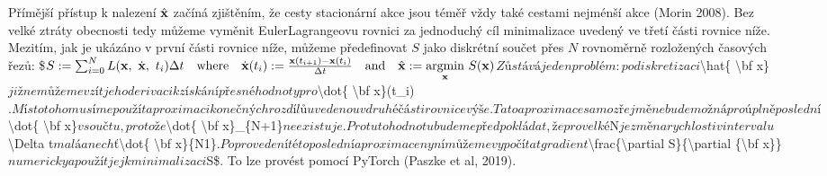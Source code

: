 \documentclass[letterpaper,10pt,english]{jupyterBook}
\begin{document}
\sphinxAtStartPar
{} Přímější přístup k nalezení \(\hat{\bf x}\) začíná zjištěním, že cesty stacionární akce jsou téměř vždy také cestami nejménší akce (Morin 2008). Bez velké ztráty obecnosti tedy můžeme vyměnit Euler\sphinxhyphen{}Lagrangeovu rovnici za jednoduchý cíl minimalizace uvedený ve třetí části rovnice níže. Mezitím, jak je ukázáno v první části rovnice níže, můžeme předefinovat \(S\) jako diskrétní součet přes \(N\) rovnoměrně rozložených časových řezů:
\$\(
S := \sum_{i=0}^{N} L({\bf x}, ~ \dot{{\bf x}}, ~ t_i) \Delta t \quad \textrm{where} \quad \dot{{\bf x}}(t_i) := \frac{ {\bf x}(t_{i+1}) - {\bf x}(t_{i})}{\Delta t} \quad \textrm{and} \quad \hat{\bf x} := \underset{\bf x}{\textrm{argmin}} ~ S(\bf x)
\)\(
Zůstává jeden problém: po diskretizaci \)\textbackslash{}hat\{ \textbackslash{}bf x\}\( již nemůžeme vzít jeho derivaci k získání přesné hodnoty pro \)\textbackslash{}dot\{ \textbackslash{}bf x\}(t\_i)\(. Místo toho musíme použít aproximaci konečných rozdílů uvedenou v druhé části rovnice výše. Tato aproximace samozřejmě nebude možná pro úplně poslední \)\textbackslash{}dot\{ \textbackslash{}bf x\}\( v součtu, protože \)\textbackslash{}dot\{ \textbackslash{}bf x\}\_\{N+1\}\( neexistuje. Pro tuto hodnotu budeme předpokládat, že pro velké \)N\( je změna rychlosti v intervalu \)\textbackslash{}Delta t\( malá a nechť \)\textbackslash{}dot\{ \textbackslash{}bf x\}\{N\sphinxhyphen{}1\}\(. Po provedení této poslední aproximace nyní můžeme vypočítat gradient \)\textbackslash{}frac\{\textbackslash{}partial S\}\{\textbackslash{}partial \{\textbackslash{}bf x\}\}\( numericky a použít jej k minimalizaci \)S\$. To lze provést pomocí PyTorch (Paszke et al, 2019).
\end{document}
